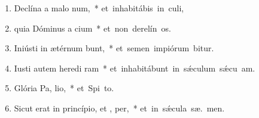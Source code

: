 \begin{flushleft}
\begin{enumerate}[leftmargin=*]
\item Declína a malo   num,~* \mbox{et inhabitábis in  culi,}

\item quia Dóminus a cium~* \mbox{et non derelín  os.}

\item Iniústi in ætérnum bunt,~* \mbox{et semen impiórum bitur.}

\item Iusti autem heredi ram~* \mbox{et inhabitábunt in s\'{\ae}culum s\'{\ae}cu  am.}


\item Glória Pa,  lio,~* \mbox{et Spi to.}

\item Sicut erat in princípio, et ,  per,~* \mbox{et in s\'{\ae}cula sæ. men.}

\end{enumerate}
\end{flushleft}

